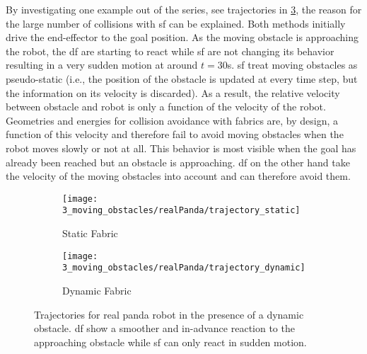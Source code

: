 By investigating one example out of the series, see trajectories in
\cref{fig:experiment3_realPanda_example}, the reason for the large number of collisions
with \ac{sf} can be explained.
Both methods initially drive
the end-effector to the goal position. As the moving obstacle is approaching the robot,
the \ac{df} are starting to react while \ac{sf} are not changing its behavior resulting
in a very sudden motion at around $t=30$s.
\ac{sf} treat moving obstacles as pseudo-static (i.e., the position of the obstacle
is updated at every time step, but the information on its velocity is discarded).  As a
result, the relative velocity between obstacle and robot is only a function of the
velocity of the robot. Geometries and energies for collision avoidance with fabrics are,
by design, a function of this velocity and therefore fail to avoid moving obstacles when
the robot moves slowly or not at all. This behavior is most visible when the goal has
already been reached but an obstacle is approaching. \ac{df} on the other hand
take the velocity of the moving obstacles into account and can therefore avoid them.
%
\begin{figure}[ht]
  \centering
  \begin{subfigure}{0.45\linewidth}
    \centering
    \texttt{[image: 3\_moving\_obstacles/realPanda/trajectory\_static]}
    \caption{Static Fabric}%
    \label{subfig:experiment3_realPanda_trajectory_static}
  \end{subfigure}%
  \begin{subfigure}{0.45\linewidth}
    \centering
    \texttt{[image: 3\_moving\_obstacles/realPanda/trajectory\_dynamic]}
    \caption{Dynamic Fabric}%
    \label{subfig:experiment3_realPanda_trajectory_dynamic}
  \end{subfigure}
  \caption{Trajectories for real panda robot in the presence of a dynamic obstacle. \ac{df}
    show a smoother and in-advance reaction to the approaching obstacle
    while \ac{sf} can only react in sudden motion.
  }%
  \label{fig:experiment3_realPanda_example}
\end{figure}

\iffalse%
\MS{Takeaway Experiment3: Only dynamic fabrics are able to respect dynamic obstacles.}
\fi


